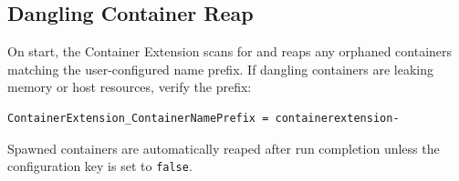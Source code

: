 \subsection{Dangling Container Reap}
On start, the Container Extension scans for and reaps any orphaned containers matching the user-configured name prefix. If dangling containers are leaking memory or host resources, verify the prefix:
\begin{lstlisting}[language=bash]
ContainerExtension_ContainerNamePrefix = containerextension-
\end{lstlisting}
Spawned containers are automatically reaped after run completion unless the configuration key  is set to \texttt{false}.
